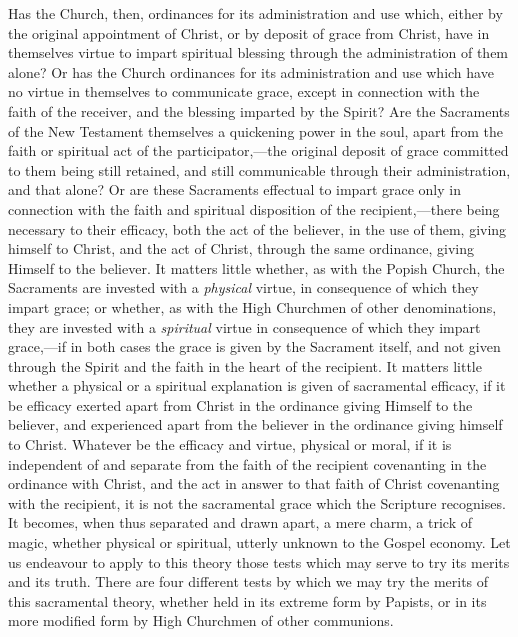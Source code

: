 \documentclass[]{book}
\begin{document}
Has the Church, then, ordinances for its administration and use which, either by the original appointment of Christ, or by deposit of grace from Christ, have in themselves virtue to impart spiritual blessing through the administration of them alone? Or has the Church ordinances for its administration and use which have no virtue in themselves to communicate grace, except in connection with the faith of the receiver, and the blessing imparted by the Spirit? Are the Sacraments of the New Testament themselves a quickening power in the soul, apart from the faith or spiritual act of the participator,---the original deposit of grace committed to them being still retained, and still communicable through their administration, and that alone? Or are these Sacraments effectual to impart grace only in connection with the faith and spiritual disposition of the recipient,---there being necessary to their efficacy, both the act of the believer, in the use of them, giving himself to Christ, and the act of Christ, through the same ordinance, giving Himself to the believer. It matters little whether, as with the Popish Church, the Sacraments are invested with a \emph{physical} virtue, in consequence of which they impart grace; or whether, as with the High Churchmen of other denominations, they are invested with a \emph{spiritual} virtue in consequence of which they impart grace,---if in both cases the grace is given by the Sacrament itself, and not given through the Spirit and the faith in the heart of the recipient. It matters little whether a physical or a spiritual explanation is given of sacramental efficacy, if it be efficacy exerted apart from Christ in the ordinance giving Himself to the believer, and experienced apart from the believer in the ordinance giving himself to Christ. Whatever be the efficacy and virtue, physical or moral, if it is independent of and separate from the faith of the recipient covenanting in the ordinance with Christ, and the act in answer to that faith of Christ covenanting with the recipient, it is not the sacramental grace which the Scripture recognises. It becomes, when thus separated and drawn apart, a mere charm, a trick of magic, whether physical or spiritual, utterly unknown to the Gospel economy. Let us endeavour to apply to this theory those tests which may serve to try its merits and its truth. There are four different tests by which we may try the merits of this sacramental theory, whether held in its extreme form by Papists, or in its more modified form by High Churchmen of other communions.
\end{document}

